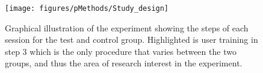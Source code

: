 \begin{figure}[H]                                         
	\texttt{[image: figures/pMethods/Study\_design]}  
	\caption{Graphical illustration of the experiment showing the steps of each session for the test and control group. Highlighted is user training in step 3 which is the only procedure that varies between the two groups, and thus the area of research interest in the experiment.}
	\label{fig:std} 
\end{figure}   
